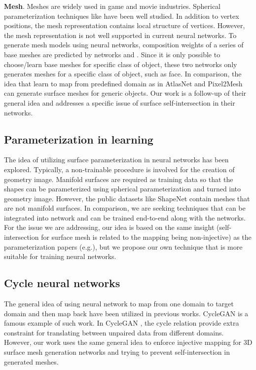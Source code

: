 \noindent\textbf{Mesh}.
Meshes are widely used in game and movie industries. Spherical parameterization techniques like \cite{HuAHSP2018} have been well studied.
In addition to vertex positions, the mesh representation contains local structure of vertices. 
However, the mesh representation is not well supported in current neural networks.
% 
To generate mesh models using neural networks, composition weights of a series of base meshes are predicted by networks \cite{img2mesh} and \cite{endface}. %
Since it is only possible to choose/learn base meshes for specific class of object, these two networks only generates meshes for a specific class of object, such as face.
%
In comparison, the idea that learn to map from predefined domain as in AtlasNet \cite{atlasnet} and Pixel2Mesh\cite{pixel2mesh} can generate surface meshes for generic objects. Our work is a follow-up of their general idea and addresses a specific issue of surface self-intersection in their networks.

\subsection{Parameterization in learning}
The idea of utilizing surface parameterization in neural networks has been explored\cite{surfnet,geoimg}. 
Typically, a non-trainable procedure is involved for the creation of geometry image. 
Manifold surfaces are required as training data so that the shapes can be parameterized using spherical parameterization and turned into geometry image. However, the public datasets like ShapeNet\cite{shapenetdata} contain meshes that are not manifold surfaces. 
In comparison, we are seeking techniques that can be integrated into network and can be trained end-to-end along with the networks. For the issue we are addressing, our idea is based on the same insight (self-intersection for surface mesh is related to the mapping being non-injective) as the parameterization papers (e.g.\cite{provableplanarmapping,lifted_bijection,freeboundary,boundeddistortion,Liu_PP_2018}), but we propose our own technique that is more suitable for training neural networks. 

\subsection{Cycle neural networks}
The general idea of using neural network to map from one domain to target domain and then map back have been utilized in previous works. CycleGAN \cite{CycleGAN2017} is a famous example of such work. In CycleGAN \cite{CycleGAN2017}, the cycle relation provide extra constraint for translating between unpaired data from different domains. However, our work uses the same general idea to enforce injective mapping for 3D surface mesh generation networks and trying to prevent self-intersection in generated meshes. 

